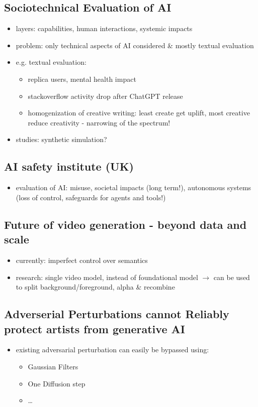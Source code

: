 \documentclass[a4paper]{article}
\begin{document}
\subsection*{Sociotechnical Evaluation of AI}
\begin{itemize}
    \item layers: capabilities, human interactions, systemic impacts
    \item problem: only technical aspects of AI considered \& mostly textual evaluation
    \item e.g. textual evaluation:
          \begin{itemize}
              \item replica users, mental health impact
              \item stackoverflow activity drop after ChatGPT release
              \item homogenization of creative writing: least create get uplift, most creative reduce creativity - narrowing of the spectrum!
          \end{itemize}
    \item studies: synthetic simulation?
\end{itemize}
\subsection*{AI safety institute (UK)}
\begin{itemize}
    \item evaluation of AI: misuse, societal impacts (long term!), autonomous systems (loss of control, safeguards for agents and tools!)
\end{itemize}
\subsection*{Future of video generation - beyond data and scale}
\begin{itemize}
    \item currently: imperfect control over semantics
    \item research: single video model, instead of foundational model $\rightarrow$ can be used to split background/foreground, alpha \& recombine
\end{itemize}
\subsection*{Adverserial Perturbations cannot Reliably protect artists from generative AI}
\begin{itemize}
    \item existing adversarial perturbation can easily be bypassed using:
    \begin{itemize}
        \item Gaussian Filters
        \item One Diffusion step
        \item  \dots
    \end{itemize}
\end{itemize}
\end{document}
